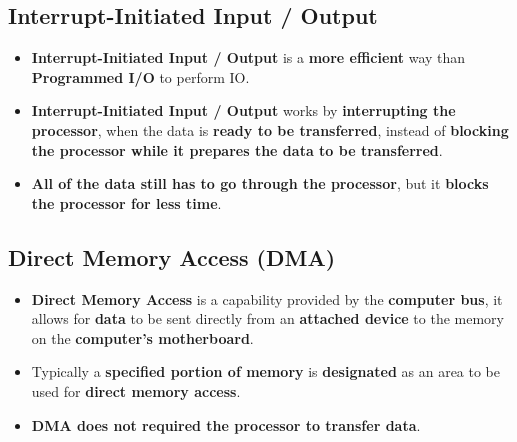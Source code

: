 \documentclass[16pt]{article}
\begin{document}
    \subsection*{Interrupt-Initiated Input / Output}
    \begin{itemize}
        \item \textbf{Interrupt-Initiated Input / Output} is a \textbf{more efficient} way than \textbf{Programmed I/O} to perform IO.
        \item \textbf{Interrupt-Initiated Input / Output} works by \textbf{interrupting the processor}, when the data is \textbf{ready to be transferred}, instead of \textbf{blocking the processor while it prepares the data to be transferred}.
        \item \textbf{All of the data still has to go through the processor}, but it \textbf{blocks the processor for less time}.
    \end{itemize}

    \subsection*{Direct Memory Access (DMA)}
    \begin{itemize}
        \item \textbf{Direct Memory Access} is a capability provided by the \textbf{computer bus}, it allows for \textbf{data} to be sent directly from an \textbf{attached device} to the memory on the \textbf{computer's motherboard}.
        \item Typically a \textbf{specified portion of memory} is \textbf{designated} as an area to be used for \textbf{direct memory access}.
        \item \textbf{DMA does not required the processor to transfer data}.
    \end{itemize}
\end{document}
